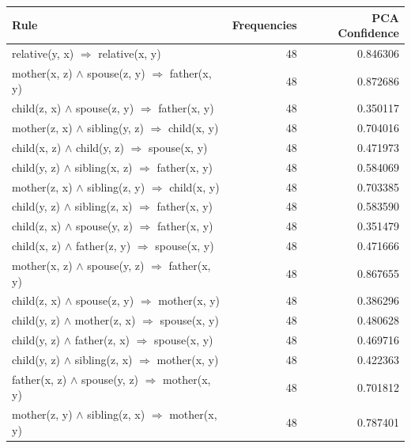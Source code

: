 \begin{longtable}{lrr}
\toprule
                                                    Rule &  Frequencies &  PCA Confidence \\
\midrule
                  relative(y, x)   $\Rightarrow$ relative(x, y) &           48 &        0.846306 \\
      mother(x, z) $\wedge$ spouse(z, y)   $\Rightarrow$ father(x, y) &           48 &        0.872686 \\
       child(z, x) $\wedge$ spouse(z, y)   $\Rightarrow$ father(x, y) &           48 &        0.350117 \\
      mother(z, x) $\wedge$ sibling(y, z)   $\Rightarrow$ child(x, y) &           48 &        0.704016 \\
        child(x, z) $\wedge$ child(y, z)   $\Rightarrow$ spouse(x, y) &           48 &        0.471973 \\
      child(y, z) $\wedge$ sibling(x, z)   $\Rightarrow$ father(x, y) &           48 &        0.584069 \\
      mother(z, x) $\wedge$ sibling(z, y)   $\Rightarrow$ child(x, y) &           48 &        0.703385 \\
      child(y, z) $\wedge$ sibling(z, x)   $\Rightarrow$ father(x, y) &           48 &        0.583590 \\
       child(z, x) $\wedge$ spouse(y, z)   $\Rightarrow$ father(x, y) &           48 &        0.351479 \\
       child(x, z) $\wedge$ father(z, y)   $\Rightarrow$ spouse(x, y) &           48 &        0.471666 \\
      mother(x, z) $\wedge$ spouse(y, z)   $\Rightarrow$ father(x, y) &           48 &        0.867655 \\
       child(z, x) $\wedge$ spouse(z, y)   $\Rightarrow$ mother(x, y) &           48 &        0.386296 \\
       child(y, z) $\wedge$ mother(z, x)   $\Rightarrow$ spouse(x, y) &           48 &        0.480628 \\
       child(y, z) $\wedge$ father(z, x)   $\Rightarrow$ spouse(x, y) &           48 &        0.469716 \\
      child(y, z) $\wedge$ sibling(z, x)   $\Rightarrow$ mother(x, y) &           48 &        0.422363 \\
      father(x, z) $\wedge$ spouse(y, z)   $\Rightarrow$ mother(x, y) &           48 &        0.701812 \\
     mother(z, y) $\wedge$ sibling(z, x)   $\Rightarrow$ mother(x, y) &           48 &        0.787401 \\

\end{longtable}
